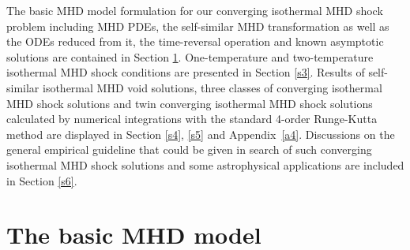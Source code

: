 \documentclass[fleqn,usenatbib]{mnras}
\begin{document}
The basic MHD model formulation for our converging isothermal MHD shock problem including MHD PDEs, the self-similar MHD transformation as well as the ODEs reduced from it, the time-reversal operation and known asymptotic solutions are contained in Section \ref{s2}. One-temperature and two-temperature isothermal MHD shock conditions are presented in Section \ref{s3}. Results of self-similar isothermal MHD void solutions, three classes of converging isothermal MHD shock solutions and twin converging isothermal MHD shock solutions calculated by numerical integrations with the standard 4-order Runge-Kutta method are displayed in Section \ref{s4}, \ref{s5} and Appendix~\ref{a4}. Discussions on the general empirical guideline that could be given in search of such converging isothermal MHD shock solutions and some astrophysical applications are included in Section \ref{s6}. 


\section{The basic MHD model}
\label{s2}
\end{document}
